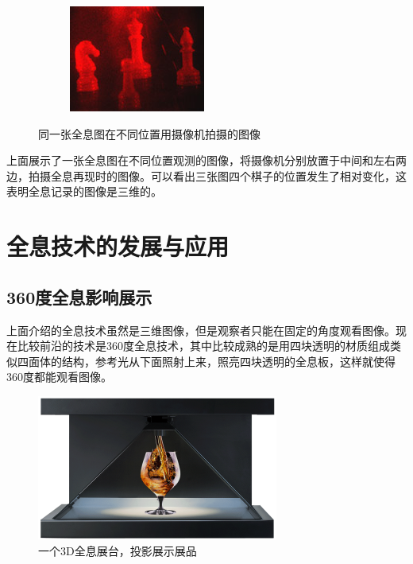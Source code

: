 \documentclass{article}
\begin{document}
\begin{multicols}{2}
\begin{figure}[H]
\begin{subfigure}{0.48\linewidth}
  \end{subfigure}
  \begin{subfigure}{0.48\linewidth}
    \includegraphics[width=\linewidth]{figures/全息拍摄右}
  \end{subfigure}
  \caption{同一张全息图在不同位置用摄像机拍摄的图像}
\end{figure}

上面展示了一张全息图在不同位置观测的图像，将摄像机分别放置于中间和左右两边，拍摄全息再现时的图像。可以看出三张图四个棋子的位置发生了相对变化，这表明全息记录的图像是三维的。
\section{全息技术的发展与应用}

\subsection{360度全息影响展示}

上面介绍的全息技术虽然是三维图像，但是观察者只能在固定的角度观看图像。现在比较前沿的技术是360度全息技术，其中比较成熟的是用四块透明的材质组成类似四面体的结构，参考光从下面照射上来，照亮四块透明的全息板，这样就使得360度都能观看图像。

\begin{figure}[H]
  \centering
  \includegraphics[width=0.9\linewidth]{figures/3D全息}
  \caption{一个3D全息展台，投影展示展品}
\end{figure}


\end{multicols}
\end{document}
